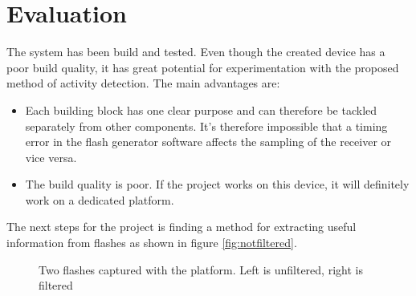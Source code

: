 \section{Evaluation}
The system has been build and tested. Even though the created device has a poor build quality, it has great potential for experimentation with the proposed method of activity detection. The main advantages are:
\begin{itemize}[itemsep=-1ex]
	\item Each building block has one clear purpose and can therefore be tackled separately from other components. It's therefore impossible that a timing error in the flash generator software affects the sampling of the receiver or vice versa.
	\item The build quality is poor. If the project works on this device, it will definitely work on a dedicated platform.
\end{itemize}
The next steps for the project is finding a method for extracting useful information from flashes as shown in figure \ref{fig:notfiltered}. 

\begin{figure}
	\centering     %
	\label{fig:FristFlashes}
	\caption{Two flashes captured with the platform. Left is unfiltered, right is filtered}
\end{figure}
